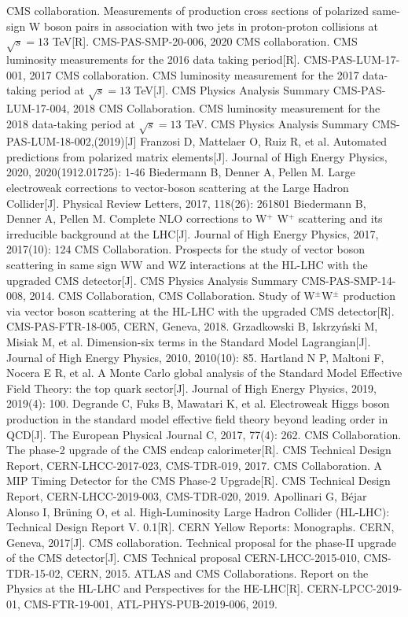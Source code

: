 \documentclass{SCIS2020cn}
\begin{document}
\begin{thebibliography}{99}
 CMS collaboration. Measurements of production cross sections of polarized same-sign W boson pairs in association with two jets in proton-proton collisions at $\sqrt{s} = 13$ TeV[R]. CMS-PAS-SMP-20-006, 2020
 CMS collaboration. CMS luminosity measurements for the 2016 data taking period[R]. CMS-PAS-LUM-17-001, 2017
 CMS collaboration. CMS luminosity measurement for the 2017 data-taking period at $\sqrt{s} = 13$ TeV[J]. CMS Physics Analysis Summary CMS-PAS-LUM-17-004, 2018
 CMS Collaboration. CMS luminosity measurement for the 2018 data-taking period at $\sqrt{s} = 13$ TeV. CMS Physics Analysis Summary CMS-PAS-LUM-18-002,(2019)[J]
 Franzosi D, Mattelaer O, Ruiz R, et al. Automated predictions from polarized matrix elements[J]. Journal of High Energy Physics, 2020, 2020(1912.01725): 1-46
 Biedermann B, Denner A, Pellen M. Large electroweak corrections to vector-boson scattering at the Large Hadron Collider[J]. Physical Review Letters, 2017, 118(26): 261801
 Biedermann B, Denner A, Pellen M. Complete NLO corrections to W$^+$ W$^+$ scattering and its irreducible background at the LHC[J]. Journal of High Energy Physics, 2017, 2017(10): 124
 CMS Collaboration. Prospects for the study of vector boson scattering in same sign WW and WZ interactions at the HL-LHC with the upgraded CMS detector[J]. CMS Physics Analysis Summary CMS-PAS-SMP-14-008, 2014.
 CMS Collaboration, CMS Collaboration. Study of W$^{\pm}$W$^{\pm}$ production via vector boson scattering at the HL-LHC with the upgraded CMS detector[R]. CMS-PAS-FTR-18-005, CERN, Geneva, 2018.
 Grzadkowski B, Iskrzyński M, Misiak M, et al. Dimension-six terms in the Standard Model Lagrangian[J]. Journal of High Energy Physics, 2010, 2010(10): 85.
 Hartland N P, Maltoni F, Nocera E R, et al. A Monte Carlo global analysis of the Standard Model Effective Field Theory: the top quark sector[J]. Journal of High Energy Physics, 2019, 2019(4): 100.
 Degrande C, Fuks B, Mawatari K, et al. Electroweak Higgs boson production in the standard model effective field theory beyond leading order in QCD[J]. The European Physical Journal C, 2017, 77(4): 262.
 CMS Collaboration. The phase-2 upgrade of the CMS endcap calorimeter[R]. CMS Technical Design Report, CERN-LHCC-2017-023, CMS-TDR-019, 2017.
 CMS Collaboration. A MIP Timing Detector for the CMS Phase-2 Upgrade[R]. CMS Technical Design Report, CERN-LHCC-2019-003, CMS-TDR-020, 2019.
 Apollinari G, Béjar Alonso I, Brüning O, et al. High-Luminosity Large Hadron Collider (HL-LHC): Technical Design Report V. 0.1[R]. CERN Yellow Reports: Monographs. CERN, Geneva, 2017[J].
 CMS collaboration. Technical proposal for the phase-II upgrade of the CMS detector[J]. CMS Technical proposal CERN-LHCC-2015-010, CMS-TDR-15-02, CERN, 2015.
 ATLAS and CMS Collaborations. Report on the Physics at the HL-LHC and Perspectives for the HE-LHC[R]. CERN-LPCC-2019-01, CMS-FTR-19-001, ATL-PHYS-PUB-2019-006, 2019.

\end{thebibliography}
\end{document}
